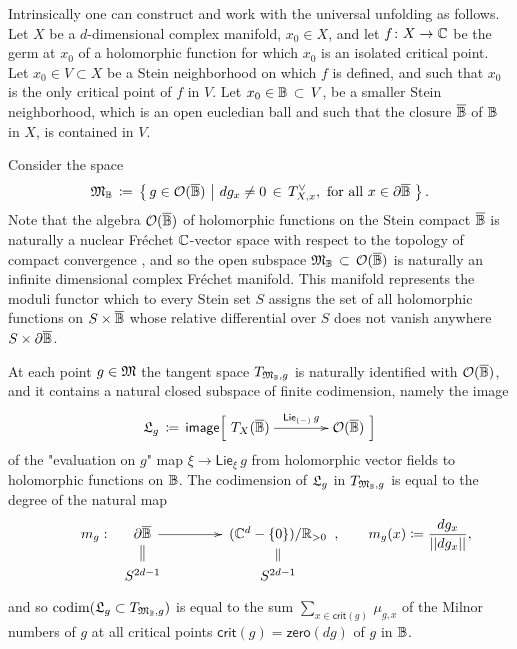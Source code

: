 \documentclass[twoside,leqno]{article}
\numberwithin{equation}{section}
\theoremstyle{plain}
\theoremstyle{definition}
\begin{document}
Intrinsically one can construct and work with the universal unfolding as follows. Let $X$ be a $d$-dimensional complex manifold, $x_{0} \in X$, and let $f \colon X \to \mathbb C$ be the germ at $x_{0}$ of a holomorphic function for which $x_{0}$ is an isolated critical point. Let $x_{0} \in V \subset X$ be a Stein neighborhood on which $f$ is defined, and such that $x_{0}$ is the only critical point of $f$ in $V$. Let $x_{0} \in \mathbb{B} \, \subset \, V$, be a smaller Stein neighborhood, which is an open eucledian ball and such that the closure $\overline{\mathbb{B}}$ of $\mathbb{B}$ in $X$, is contained in $V$. 

Consider the space
\[
\mathfrak{M}_{\mathbb{B}} \, \coloneqq \, \left\{ \, g \in \mathcal O(\overline{\mathbb{B}}) \, \left| \ dg_{x} \neq 0 \, \in \, T_{X,x}^{\vee}, \ \text{for all} \ x \in \partial \overline{\mathbb{B}} \, \right.\right\}.
\]
Note that the algebra $\mathcal O(\overline{\mathbb{B}})$ of holomorphic functions on the Stein compact $\overline{\mathbb{B}}$ is naturally a nuclear Fr\'{e}chet $\mathbb C$-vector space with respect to the topology of compact convergence \cite[Chapter V.6.1]{GrauertRemmert_Stein}, and so the open subspace 
$\mathfrak{M}_{\mathbb{B}} \, \subset \, \mathcal O(\overline{\mathbb{B}})$ is naturally an infinite dimensional complex  
Fr\'{e}chet manifold. This manifold represents the moduli functor which to every Stein set $S$ assigns the set of all holomorphic functions on $S\times \overline{\mathbb{B}}$ whose relative differential over $S$ does not vanish anywhere  $S\times \partial\overline{\mathbb{B}}$. 

At each point $g \in \mathfrak{M}$ the tangent space $T_{\mathfrak{M}_{\mathbb{B}},g}$ is naturally identified with $\mathcal O(\overline{\mathbb{B}})$, and it contains a natural closed subspace of finite codimension, namely
the image
\[
\folunivop_{g}  \, \coloneqq \, \mathsf{image} \Big[\xymatrix@1@C+1.2pc@M+0.2pc{T_{X}(\overline{\ball}) \ar[r]^-{\mathsf{Lie}_{(-)} \, g} & \cO(\overline{\ball})}\Big] 
\]
of the "evaluation on $g$" map $\xi \to \mathsf{Lie}_{\xi} \, g$ from holomorphic vector fields to holomorphic functions on $\mathbb{B}$. 
The codimension of $\mathfrak{L}_{g}$ in $T_{\mathfrak{M}_{\mathbb{B}},g}$ is equal to the
degree of the natural map 
\begin{equation} \label{eq:deg}
\xymatrix@R-1.2pc@C+1.2pc@M+0.2pc{
m_{g} \, \colon \, \hspace{-5pc} & \partial\overline{\ball} \ar@{=}[d] \ar[r] & (\bbC^{d}-\{0\})/\bbR_{>0} \ar@{=}[d]\\
& S^{2d-1} & S^{2d-1}
}, \qquad m_{g}(x) \coloneqq \frac{dg_{x}}{||dg_{x}||},
\end{equation}
and so $\operatorname{codim}(\mathfrak{L}_{g}\subset T_{\mathfrak{M}_{\mathbb{B}},g})$ is equal to the 
sum $\sum_{x \in \mathsf{crit}(g)} \, \mu_{g,x}$ of the Milnor numbers of $g$ at all critical points $\mathsf{crit}(g) = \mathsf{zero}(dg)$ of $g$ in $\mathbb{B}$. 
\end{document}

